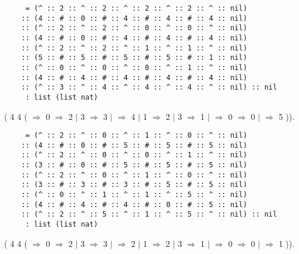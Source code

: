 \documentclass[12pt]{report}
\begin{document}
\begin{verbatim}
     = (^ :: 2 :: ^ :: 2 :: ^ :: 2 :: ^ :: 2 :: ^ :: nil)
    :: (4 :: # :: 0 :: # :: 4 :: # :: 4 :: # :: 4 :: nil)
    :: (^ :: 2 :: ^ :: 2 :: ^ :: 0 :: ^ :: 0 :: ^ :: nil)
    :: (4 :: # :: 0 :: # :: 4 :: # :: 4 :: # :: 4 :: nil)
    :: (^ :: 2 :: ^ :: 2 :: ^ :: 1 :: ^ :: 1 :: ^ :: nil)
    :: (5 :: # :: 5 :: # :: 5 :: # :: 5 :: # :: 1 :: nil)
    :: (^ :: 0 :: ^ :: 0 :: ^ :: 0 :: ^ :: 1 :: ^ :: nil)
    :: (4 :: # :: 4 :: # :: 4 :: # :: 4 :: # :: 4 :: nil)
    :: (^ :: 3 :: ^ :: 4 :: ^ :: 4 :: ^ :: 4 :: ^ :: nil) :: nil
     : list (list nat)
\end{verbatim}
  \begin{coqdoccode}
\coqdocemptyline
\coqdocnoindent
{} ( 4 4 (   \ensuremath{\Rightarrow}    0 \ensuremath{\Rightarrow}    2 \ensuremath{|} 3 \ensuremath{\Rightarrow} 3 \ensuremath{|} \coqdocvar{\_} \ensuremath{\Rightarrow} 4  \ensuremath{|} 1 \ensuremath{\Rightarrow} 2 \ensuremath{|} 3 \ensuremath{\Rightarrow} 1 \ensuremath{|} \coqdocvar{\_} \ensuremath{\Rightarrow}    0 \ensuremath{\Rightarrow} 0 \ensuremath{|} \coqdocvar{\_} \ensuremath{\Rightarrow} 5  )).\coqdoceol
\end{coqdoccode}
 
\begin{verbatim}
     = (^ :: 2 :: ^ :: 0 :: ^ :: 1 :: ^ :: 0 :: ^ :: nil)
    :: (4 :: # :: 0 :: # :: 5 :: # :: 5 :: # :: 5 :: nil)
    :: (^ :: 2 :: ^ :: 0 :: ^ :: 0 :: ^ :: 1 :: ^ :: nil)
    :: (3 :: # :: 0 :: # :: 5 :: # :: 5 :: # :: 5 :: nil)
    :: (^ :: 2 :: ^ :: 0 :: ^ :: 1 :: ^ :: 0 :: ^ :: nil)
    :: (3 :: # :: 3 :: # :: 3 :: # :: 5 :: # :: 5 :: nil)
    :: (^ :: 0 :: ^ :: 1 :: ^ :: 1 :: ^ :: 5 :: ^ :: nil)
    :: (4 :: # :: 4 :: # :: 4 :: # :: 0 :: # :: 5 :: nil)
    :: (^ :: 2 :: ^ :: 5 :: ^ :: 1 :: ^ :: 5 :: ^ :: nil) :: nil
     : list (list nat)
\end{verbatim}
  \begin{coqdoccode}
\coqdocemptyline
\coqdocnoindent
{} ( 4 4 (   \ensuremath{\Rightarrow}    0 \ensuremath{\Rightarrow}    2 \ensuremath{|} 3 \ensuremath{\Rightarrow} 3 \ensuremath{|} \coqdocvar{\_} \ensuremath{\Rightarrow} 2  \ensuremath{|} 1 \ensuremath{\Rightarrow} 2 \ensuremath{|} 3 \ensuremath{\Rightarrow} 1 \ensuremath{|} \coqdocvar{\_} \ensuremath{\Rightarrow}    0 \ensuremath{\Rightarrow} 0 \ensuremath{|} \coqdocvar{\_} \ensuremath{\Rightarrow} 1  )).\coqdoceol
\end{coqdoccode}
 
\end{document}
